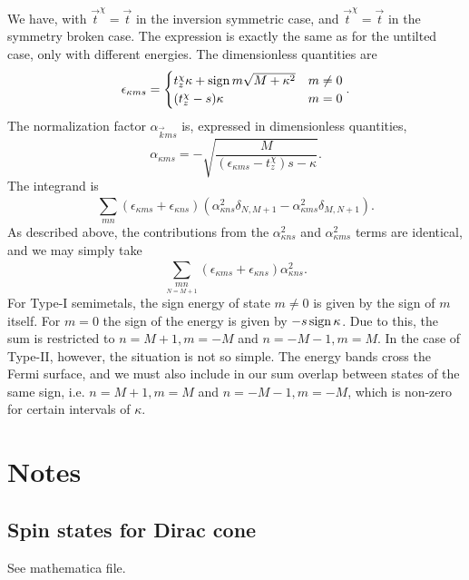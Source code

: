 We have, with \( \vec{t}^{\chi } = \vec{t} \) in the inversion symmetric case, and \( \vec{t}^{\chi } = \vec{t} \) in the symmetry broken case.
The expression is exactly the same as for the untilted case, only with different energies.
The dimensionless quantities are
\begin{equation}
  \label{eq:104}
  \epsilon_{\kappa m s} =
  \begin{cases}
    t_z^{\chi } \kappa + \operatorname{sign}{m} \sqrt{M + \kappa ^2} & m \neq 0\\
    (t_z^{\chi } - s) \kappa & m = 0
  \end{cases}.
\end{equation}
The normalization factor \( \alpha _{\vec{k} m s} \) is, expressed in dimensionless quantities,
\begin{equation}
  \label{eq:105}
  \alpha _{\kappa m s} =
  -\sqrt{\frac{M}{(\epsilon_{\kappa  m s} - t_{z}^{\chi })s - \kappa }}.
\end{equation}
The integrand is
\begin{equation}
  \label{eq:106}
  \sum\limits_{mn}^{}
  (\epsilon_{\kappa m s} + \epsilon_{\kappa n s}) (\alpha_{\kappa n s}^2 \delta _{N, M+1}- \alpha_{\kappa m s}^2 \delta_{M, N+1}).
\end{equation}
As described above, the contributions from the \( \alpha _{\kappa n s}^2  \) and \( \alpha _{\kappa m s}^2 \) terms are identical, and we may simply take
\begin{equation}
  \label{eq:107}
  \sum\limits_{\underset{N=M+1}{mn}}^{}
  (\epsilon_{\kappa m s} + \epsilon_{\kappa n s}) \alpha_{\kappa n s}^2.
\end{equation}
For Type-I semimetals, the sign energy of state \( m \neq 0 \) is given by the sign of \( m \) itself.
For \( m = 0 \) the sign of the energy is given by \( -s \operatorname{sign}{\kappa } \).
Due to this, the sum is restricted to \( n=M+1, m=-M \) and \( n=-M-1, m=M \).
In the case of Type-II, however, the situation is not so simple.
The energy bands cross the Fermi surface, and we must also include in our sum overlap between states of the same sign, i.e. \( n=M+1, m=M \) and \( n=-M-1, m=-M \), which is non-zero for certain intervals of \( \kappa  \).


\section{Notes}
\subsection{Spin states for Dirac cone}
See mathematica file.

